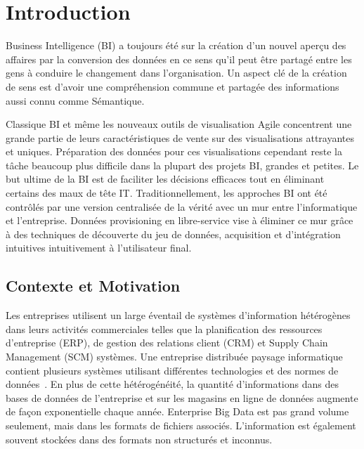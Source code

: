 \documentclass[a4paper,11pt,twoside]{ThesisStyle}
\begin{document}

\vspace{3cm}

\tableofcontents

\let\cleardoublepage\clearpage
\chapter{Introduction}

Business Intelligence (BI) a toujours été sur la création d'un nouvel aperçu des affaires par la conversion des données en ce sens qu'il peut être partagé entre les gens à conduire le changement dans l'organisation. Un aspect clé de la création de sens est d'avoir une compréhension commune et partagée des informations aussi connu comme Sémantique.

Classique BI et même les nouveaux outils de visualisation Agile concentrent une grande partie de leurs caractéristiques de vente sur des visualisations attrayantes et uniques. Préparation des données pour ces visualisations cependant reste la tâche beaucoup plus difficile dans la plupart des projets BI, grandes et petites. Le but ultime de la BI est de faciliter les décisions efficaces tout en éliminant certains des maux de tête IT. Traditionnellement, les approches BI ont été contrôlés par une version centralisée de la vérité avec un mur entre l'informatique et l'entreprise. Données provisioning en libre-service vise à éliminer ce mur grâce à des techniques de découverte du jeu de données, acquisition et d'intégration intuitives intuitivement à l'utilisateur final.

\section{Contexte et Motivation} \label{section:motivation}

Les entreprises utilisent un large éventail de systèmes d'information hétérogènes dans leurs activités commerciales telles que la planification des ressources d'entreprise (ERP), de gestion des relations client (CRM) et Supply Chain Management (SCM) systèmes. Une entreprise distribuée paysage informatique contient plusieurs systèmes utilisant différentes technologies et des normes de données~\cite{Mihindukulasooriya:COLD:13}. En plus de cette hétérogénéité, la quantité d'informations dans des bases de données de l'entreprise et sur les magasins en ligne de données augmente de façon exponentielle chaque année. Enterprise Big Data est pas grand volume seulement, mais dans les formats de fichiers associés. L'information est également souvent stockées dans des formats non structurés et inconnus.
\end{document}
